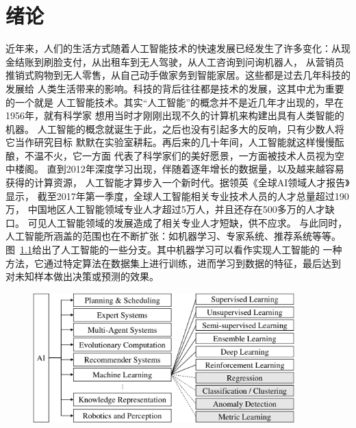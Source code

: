\chapter{绪论}\label{chap:introduction}
近年来，人们的生活方式随着人工智能技术的快速发展已经发生了许多变化：从现金结账到刷脸支付，从出租车到无人驾驶，从人工咨询到问询机器人，
从营销员推销式购物到无人零售，从自己动手做家务到智能家居。这些都是过去几年科技的发展给
人类生活带来的影响。科技的背后往往都是技术的发展，这其中尤为重要的一个就是
人工智能技术。其实``人工智能''的概念并不是近几年才出现的，早在1956年，就有科学家
想用当时才刚刚出现不久的计算机来构建出具有人类智能的机器。
人工智能的概念就诞生于此，之后也没有引起多大的反响，只有少数人将它当作研究目标
默默在实验室耕耘。再后来的几十年间，人工智能就这样慢慢酝酿，不温不火，它一方面
代表了科学家们的美好愿景，一方面被技术人员视为空中楼阁。
直到2012年深度学习出现，伴随着逐年增长的数据量，以及越来越容易获得的计算资源，
人工智能才算步入一个新时代。据领英《全球AI领域人才报告》显示，
截至2017年第一季度，全球人工智能相关专业技术人员的人才总量超过190万，
中国地区人工智能领域专业人才超过5万人，并且还存在500多万的人才缺口。
可见人工智能领域的发展造成了相关专业人才短缺，供不应求。
与此同时，人工智能所涵盖的范围也在不断扩张：如机器学习、专家系统、推荐系统等等。
图~\ref{fig:ai}给出了人工智能的一些分支。其中机器学习可以看作实现人工智能的
一种方法，它通过特定算法在数据集上进行训练，进而学习到数据的特征，最后达到
对未知样本做出决策或预测的效果。
\begin{figure}[htbp]
  \centering
  \includegraphics[width=0.9\textwidth]{Img/ai-content.pdf}
  \label{fig:ai}
\end{figure}

